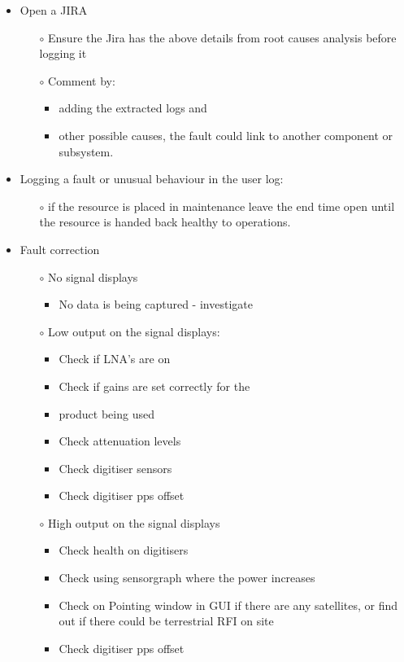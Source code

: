 \begin{itemize}
\item Open a JIRA 
\begin{itemize}
\item[$\circ$] Ensure the Jira has the above details from root causes analysis before logging it
\item[$\circ$] Comment by: 
\begin{itemize}
\item adding the extracted logs and
\item other possible causes, the fault could link to another component or subsystem.
\end{itemize}
\end{itemize}
\item Logging a fault or unusual behaviour in the user log:
\begin{itemize}
\item[$\circ$] if the resource is placed in maintenance leave the end time open until the resource is handed back healthy to operations.
\end{itemize}
\item Fault correction
\begin{itemize}
\item[$\circ$] No signal displays 
\begin{itemize}
\item No data is being captured - investigate
\end{itemize}
\end{itemize}
\begin{itemize}
\item[$\circ$] Low output on the signal displays:
\begin{itemize}
\item Check if LNA’s are on
\item Check if gains are set correctly for the \item product being used
\item Check attenuation levels
\item Check digitiser sensors
\item Check digitiser pps offset
\end{itemize}


\item[$\circ$] High output on the signal displays
\begin{itemize}
\item Check health on digitisers
\item Check using sensorgraph where the power increases
\item Check on Pointing window in GUI if there are any satellites, or find out if there could be terrestrial  RFI on site
\item Check digitiser pps offset
\end{itemize}



\end{itemize}
\end{itemize}
